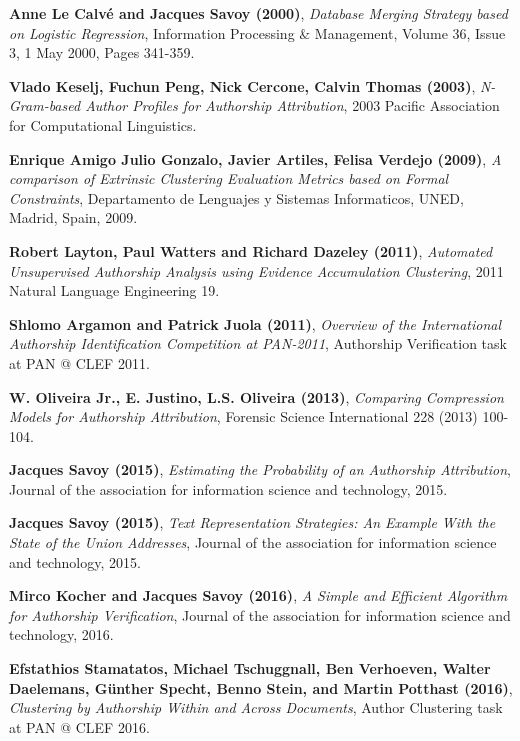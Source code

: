 \begin{thebibliography}{9}

\textbf{Anne Le Calvé and Jacques Savoy (2000)},
\textit{Database Merging Strategy based on Logistic Regression},
Information Processing \& Management, Volume 36, Issue 3, 1 May 2000, Pages 341-359.

\textbf{Vlado Keselj, Fuchun Peng, Nick Cercone, Calvin Thomas (2003)},
\textit{N-Gram-based Author Profiles for Authorship Attribution},
2003 Pacific Association for Computational Linguistics.

\textbf{Enrique Amigo Julio Gonzalo, Javier Artiles, Felisa Verdejo (2009)},
\textit{A comparison of Extrinsic Clustering Evaluation Metrics based on Formal Constraints},
Departamento de Lenguajes y Sistemas Informaticos, UNED, Madrid, Spain, 2009.

\textbf{Robert Layton, Paul Watters and Richard Dazeley (2011)},
\textit{Automated Unsupervised Authorship Analysis using Evidence Accumulation Clustering},
2011 Natural Language Engineering 19.

\textbf{Shlomo Argamon and Patrick Juola (2011)},
\textit{Overview of the International Authorship Identification Competition at PAN-2011},
Authorship Verification task at PAN @ CLEF 2011.

\textbf{W. Oliveira Jr., E. Justino, L.S. Oliveira (2013)},
\textit{Comparing Compression Models for Authorship Attribution},
Forensic Science International 228 (2013) 100-104.

\textbf{Jacques Savoy (2015)},
\textit{Estimating the Probability of an Authorship Attribution},
Journal of the association for information science and technology, 2015.

\textbf{Jacques Savoy (2015)},
\textit{Text Representation Strategies: An Example With the State of the Union Addresses},
Journal of the association for information science and technology, 2015.

\textbf{Mirco Kocher and Jacques Savoy (2016)},
\textit{A Simple and Efficient Algorithm for Authorship Verification},
Journal of the association for information science and technology, 2016.

\textbf{Efstathios Stamatatos, Michael Tschuggnall, Ben Verhoeven, Walter Daelemans, Günther Specht, Benno Stein, and Martin Potthast (2016)},
\textit{Clustering by Authorship Within and Across Documents},
Author Clustering task at PAN @ CLEF 2016.


\end{thebibliography}
